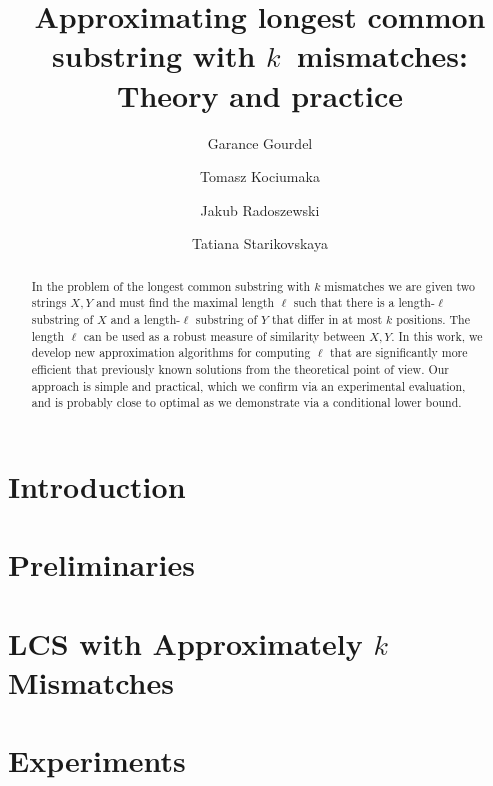 \documentclass[a4paper,UKenglish,cleveref,autoref]{lipics-v2019}
\author{Garance Gourdel}{ENS Paris Saclay, France}{garance.gourdel@ens-paris-saclay.fr}{}{}
\author{Tomasz Kociumaka}{Bar-Ilan University, Ramat Gan, Israel}{kociumaka@mimuw.edu.pl}{https://orcid.org/0000-0002-2477-1702}{Supported by ISF grants no. 1278/16 and 1926/19, a BSF grant no. 2018364, and an ERC grant MPM (no.\ 683064) under the EU's Horizon 2020 Research and Innovation~Programme.}
\author{Jakub Radoszewski}{Institute of Informatics, University of Warsaw, Warsaw, Poland \and Samsung R\&D Institute, Warsaw, Poland}{jrad@mimuw.edu.pl}{https://orcid.org/0000-0002-0067-6401}{Supported by the Polish National Science Center, grant number 2018/31/D/ST6/\allowbreak03991.}
\author{Tatiana Starikovskaya}{DIENS, \'{E}cole normale sup\'{e}rieure, PSL Research University,  France}{tat.starikovskaya@gmail.com}{}{}
\title{\texorpdfstring{Approximating longest common substring with $k$~mismatches: Theory and practice}{Approximating longest common substring with k mismatches: Theory and practice}}
\newcommand{\kApproxLCS}{\textsf{LCS with Approximately $k$ Mismatches}\xspace}
\begin{document}
\maketitle

\begin{abstract}
In the problem of the longest common substring with $k$ mismatches we are given two strings $X, Y$ and must find the maximal length $\ell$ such that there is a length-$\ell$ substring of $X$ and a length-$\ell$ substring of $Y$ that differ in at most $k$ positions. The length $\ell$ can be used as a robust measure of similarity between $X, Y$. In this work, we develop new approximation algorithms for computing $\ell$ that are significantly more efficient that previously known solutions from the theoretical point of view. Our approach is simple and practical, which we confirm via an experimental evaluation, and is probably close to optimal as we demonstrate via a conditional lower bound.
\end{abstract}

\section{Introduction}\label{sec:intro}

	
\section{Preliminaries}\label{sec:prelim}


\section{\texorpdfstring{\kApproxLCS}{LCS with approximately k mismatches}}\label{sec:klcs}



\section{Experiments}\label{sec:implem}



\end{document}
